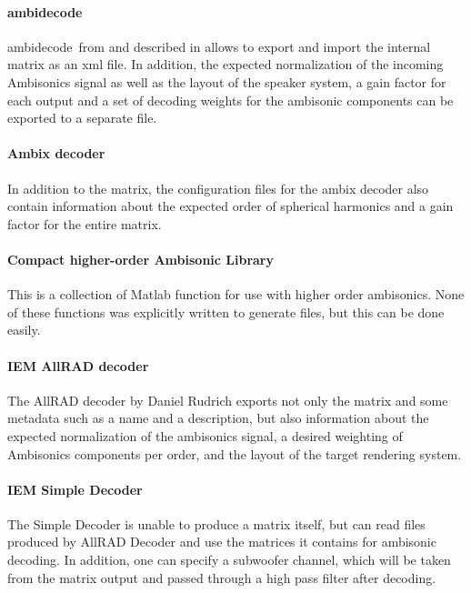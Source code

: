 \documentclass[a4paper, 10pt, twocolumn]{article}
\begin{document}
\paragraph{ambidecode\texttildelow}

ambidecode\texttildelow\ from \cite{ICSTAmbiOnline} and described in \cite{ICSTAmbiPaper} allows to export and import the internal matrix as an xml file. In addition, the expected normalization of the incoming Ambisonics signal as well as the layout of the speaker system, a gain factor for each output and a set of decoding weights for the ambisonic components can be exported to a separate file.

\paragraph{Ambix decoder}

In addition to the matrix, the configuration files for the ambix decoder also contain information about the expected order of spherical harmonics and a gain factor for the entire matrix.\cite{ambiXOnline}

\paragraph{Compact higher-order Ambisonic Library}

This is a collection of Matlab function for use with higher order ambisonics. None of these functions was explicitly written to generate files, but this can be done easily. \cite{PolarchAmbiLib}

\paragraph{IEM AllRAD decoder}

The AllRAD decoder by Daniel Rudrich exports not only the matrix and some metadata such as a name and a description, but also information about the expected normalization of the ambisonics signal, a desired weighting of Ambisonics components per order, and the layout of the target rendering system. \cite{IEMFormatOnline}

\paragraph{IEM Simple Decoder}

The Simple Decoder is unable to produce a matrix itself, but can read files produced by AllRAD Decoder and use the matrices it contains for ambisonic decoding. In addition, one can specify a subwoofer channel, which will be taken from the matrix output and passed through a high pass filter after decoding. \cite{IEMFormatOnline}
\end{document}
